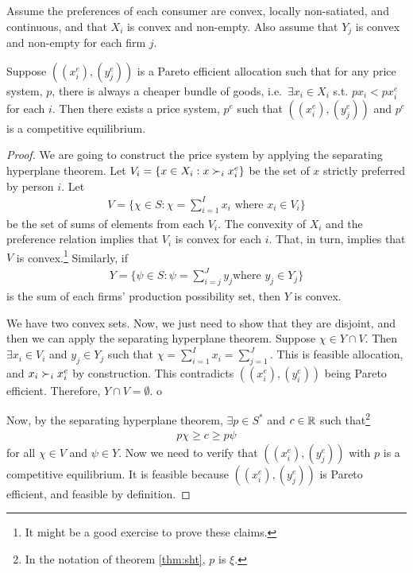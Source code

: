 \begin{theorem}
  Assume the preferences of each consumer are convex, locally
  non-satiated, and continuous, and that $X_i$ is convex and
  non-empty.  
  Also assume that $Y_j$ is convex and non-empty for each
  firm $j$. 

  Suppose $((x_i^e), (y_j^e))$ is a Pareto efficient allocation such
  that for any price system, $p$, there is always a cheaper bundle of
  goods, i.e.\ $\exists x_i \in X_i$ s.t. $p x_i < p x_i^e$ for each
  $i$. Then there exists a price system, $p^e$ such that $((x_i^e),
  (y_j^e))$ and $p^e$ is a competitive equilibrium.
\end{theorem}
\begin{proof}
  We are going to construct the price system by applying the
  separating hyperplane theorem. Let $V_i = \{ x \in X_i : x \succ_i
  x_i^e \}$ be the set of $x$ strictly preferred by person $i$. Let 
  \begin{align*}
    V = \{ \chi \in S: \chi = \sum_{i=1}^I x_i \text{ where } x_i
    \in V_i \}  
  \end{align*}
  be the set of sums of elements from each $V_i$. The convexity of
  $X_i$ and the preference relation implies that $V_i$ is convex for
  each $i$. That, in turn, implies that $V$ is convex.\footnote{It
    might be a good exercise to prove these claims. } 
  Similarly, if 
  \begin{align*}
    Y = \{ \psi \in S: \psi = \sum_{i=j}^J y_j \text{
      where } y_j \in Y_j \}  
  \end{align*}
  is the sum of each firms' production possibility set, then $Y$ is
  convex. 

  We have two convex sets. Now, we just need to show that they are
  disjoint, and then we can apply the separating hyperplane
  theorem. Suppose $\chi \in Y \cap V$. Then $\exists x_i \in V_i$ and
  $y_j \in Y_j$ such that $\chi = \sum_{i=1}^I x_i = \sum_{j=1}^J$. This
  is feasible allocation, and $x_i \succ_i x_i^e$ by
  construction. This contradicts $((x_i^e),(y_i^e))$ being Pareto
  efficient. Therefore, $Y \cap V = \emptyset$. o

  Now, by the separating hyperplane theorem, $\exists p \in S^*$ and
  $c \in \mathbb{R}$ such
  that\footnote{In the notation of theorem \ref{thm:sht}, $p$ is $\xi$.}
  \begin{align}
    p \chi \geq c \geq p \psi \label{ieq:p}
  \end{align}
  for all $\chi \in V$ and $\psi \in Y$. Now we need to verify
  that $((x_i^e),(y_j^e))$ with $p$ is a competitive equilibrium. It
  is feasible because $((x_i^e),(y_j^e))$ is Pareto efficient, and
  feasible by definition.
  

\end{proof}
